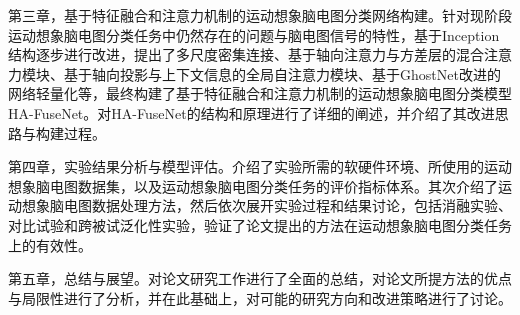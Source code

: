 第三章，基于特征融合和注意力机制的运动想象脑电图分类网络构建。针对现阶段运动想象脑电图分类任务中仍然存在的问题与脑电图信号的特性，基于Inception结构逐步进行改进，提出了多尺度密集连接、基于轴向注意力与方差层的混合注意力模块、基于轴向投影与上下文信息的全局自注意力模块、基于GhostNet改进的网络轻量化等，最终构建了基于特征融合和注意力机制的运动想象脑电图分类模型HA-FuseNet。对HA-FuseNet的结构和原理进行了详细的阐述，并介绍了其改进思路与构建过程。

第四章，实验结果分析与模型评估。介绍了实验所需的软硬件环境、所使用的运动想象脑电图数据集，以及运动想象脑电图分类任务的评价指标体系。其次介绍了运动想象脑电图数据处理方法，然后依次展开实验过程和结果讨论，包括消融实验、对比试验和跨被试泛化性实验，验证了论文提出的方法在运动想象脑电图分类任务上的有效性。

第五章，总结与展望。对论文研究工作进行了全面的总结，对论文所提方法的优点与局限性进行了分析，并在此基础上，对可能的研究方向和改进策略进行了讨论。